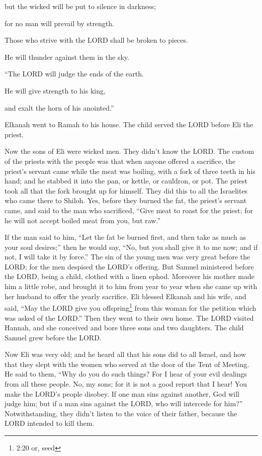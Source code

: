 but the wicked will be put to silence in darkness;

for no man will prevail by strength.

\myverse{}Those who strive with the LORD shall be broken to pieces.

He will thunder against them in the sky.

\vspace{\baselineskip} 
“The LORD will judge the ends of the earth.

He will give strength to his king,

and exalt the horn of his anointed.”

\myverse{}Elkanah went to Ramah to his house. The child served the LORD
before Eli the priest.

\myverse{}Now the sons of Eli were wicked men. They didn’t know the LORD.
\myverse{}The custom of the priests with the people was that when anyone offered a sacrifice,
the priest’s servant came while the meat was boiling, with a fork of three teeth in his hand;
\myverse{}and he stabbed it into the pan, or kettle, or cauldron, or pot. The priest
took all that the fork brought up for himself. They did this to all the Israelites who came there to Shiloh.
\myverse{}Yes, before they burned the fat, the priest’s servant came, and said to the
man who sacrificed, “Give meat to roast for the priest; for he will not accept boiled meat from you, but
raw.”

\myverse{}If the man said to him, “Let the fat be burned first, and then
take as much as your soul desires;” then he would say, “No, but you shall give it to me now; and if not,
I will take it by force.”
\myverse{}The sin of the young men was very great before the LORD; for the men despised
the LORD’s offering.
\myverse{}But Samuel ministered before the LORD, being a child, clothed with a linen
ephod.
\myverse{}Moreover his mother made him a little robe, and brought it to him from year
to year when she came up with her husband to offer the yearly sacrifice.
\myverse{}Eli blessed Elkanah and his wife, and said, “May the LORD give you offspring\footnote{2:20 or, seed} from this woman for the petition which was asked of the LORD.” Then they went
to their own home.
\myverse{}The LORD visited Hannah, and she conceived and bore three sons and two daughters.
The child Samuel grew before the LORD.

\myverse{}Now Eli was very old; and he heard all that his sons did to all
Israel, and how that they slept with the women who served at the door of the Tent of Meeting.
\myverse{}He said to them, “Why do you do such things? For I hear of your evil dealings
from all these people.
\myverse{}No, my sons; for it is not a good report that I hear! You make the LORD’s
people disobey.
\myverse{}If one man sins against another, God will judge him; but if a man sins against
the LORD, who will intercede for him?” Notwithstanding, they didn’t listen to the voice of their father,
because the LORD intended to kill them.

